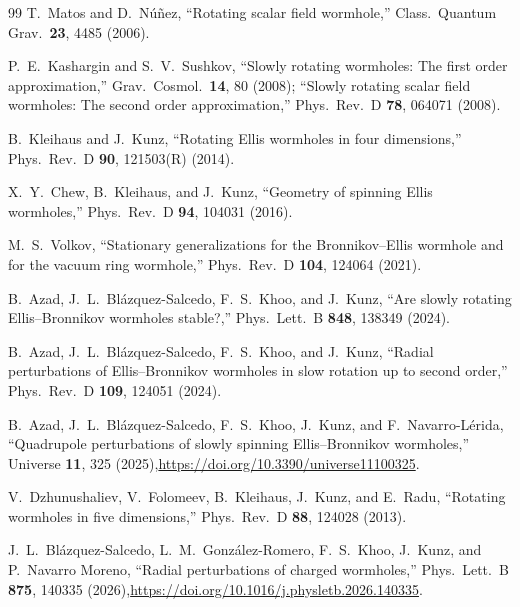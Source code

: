 \documentclass[twocolumn,floatfix,aps,prd,superscriptaddress,nofootinbib]{revtex4-2}
\begin{document}
\begin{thebibliography}{99}
T.~Matos and D.~N\'u\~nez,
\newblock ``Rotating scalar field wormhole,''
\newblock Class.\ Quantum Grav.\ \textbf{23}, 4485 (2006).

P.~E.~Kashargin and S.~V.~Sushkov,
\newblock ``Slowly rotating wormholes: The first order approximation,''
\newblock Grav.\ Cosmol.\ \textbf{14}, 80 (2008);
\newblock ``Slowly rotating scalar field wormholes: The second order approximation,''
\newblock Phys.\ Rev.\ D \textbf{78}, 064071 (2008).

B.~Kleihaus and J.~Kunz,
\newblock ``Rotating Ellis wormholes in four dimensions,''
\newblock Phys.\ Rev.\ D \textbf{90}, 121503(R) (2014).

X.~Y.~Chew, B.~Kleihaus, and J.~Kunz,
\newblock ``Geometry of spinning Ellis wormholes,''
\newblock Phys.\ Rev.\ D \textbf{94}, 104031 (2016).

M.~S.~Volkov,
\newblock ``Stationary generalizations for the Bronnikov--Ellis wormhole and for the vacuum ring wormhole,''
\newblock Phys.\ Rev.\ D \textbf{104}, 124064 (2021).

B.~Azad, J.~L.~Bl\'azquez-Salcedo, F.~S.~Khoo, and J.~Kunz,
\newblock ``Are slowly rotating Ellis--Bronnikov wormholes stable?,''
\newblock Phys.\ Lett.\ B \textbf{848}, 138349 (2024).

B.~Azad, J.~L.~Bl\'azquez-Salcedo, F.~S.~Khoo, and J.~Kunz,
\newblock ``Radial perturbations of Ellis--Bronnikov wormholes in slow rotation up to second order,''
\newblock Phys.\ Rev.\ D \textbf{109}, 124051 (2024).

B.~Azad, J.~L.~Bl\'azquez-Salcedo, F.~S.~Khoo, J.~Kunz, and F.~Navarro-L\'erida,
\newblock ``Quadrupole perturbations of slowly spinning Ellis--Bronnikov wormholes,''
\newblock Universe \textbf{11}, 325 (2025),\quad\url{https://doi.org/10.3390/universe11100325}.

V.~Dzhunushaliev, V.~Folomeev, B.~Kleihaus, J.~Kunz, and E.~Radu,
\newblock ``Rotating wormholes in five dimensions,''
\newblock Phys.\ Rev.\ D \textbf{88}, 124028 (2013).

J.~L.~Bl\'azquez-Salcedo, L.~M.~Gonz\'alez-Romero, F.~S.~Khoo, J.~Kunz, and P.~Navarro Moreno,
\newblock ``Radial perturbations of charged wormholes,''
\newblock Phys.\ Lett.\ B \textbf{875}, 140335 (2026),\quad\url{https://doi.org/10.1016/j.physletb.2026.140335}.


\end{thebibliography}
\end{document}
